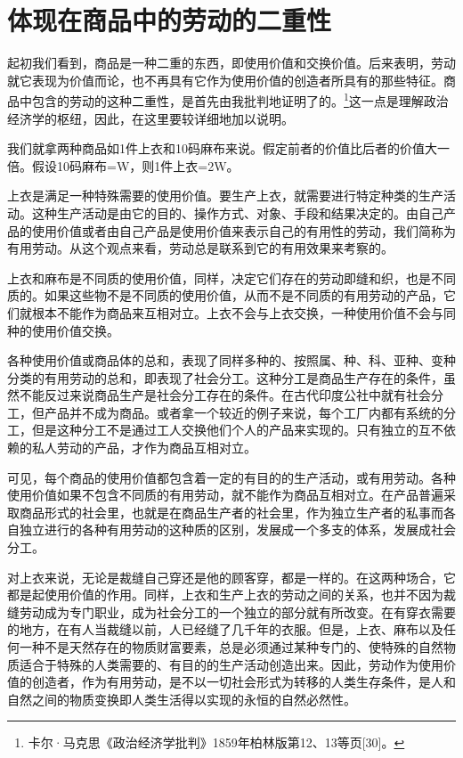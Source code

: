 \documentclass{ctexbook}
\begin{document}
    \section{体现在商品中的劳动的二重性}

    起初我们看到，商品是一种二重的东西，即使用价值和交换价值。后来表明，劳动就它表现为价值而论，也不再具有它作为使用价值的创造者所具有的那些特征。商品中包含的劳动的这种二重性，是首先由我批判地证明了的。\footnote{卡尔·马克思《政治经济学批判》1859年柏林版第12、13等页[30]。}这一点是理解政治经济学的枢纽，因此，在这里要较详细地加以说明。

    我们就拿两种商品如1件上衣和10码麻布来说。假定前者的价值比后者的价值大一倍。假设10码麻布=W，则1件上衣=2W。

    上衣是满足一种特殊需要的使用价值。要生产上衣，就需要进行特定种类的生产活动。这种生产活动是由它的目的、操作方式、对象、手段和结果决定的。由自己产品的使用价值或者由自己产品是使用价值来表示自己的有用性的劳动，我们简称为有用劳动。从这个观点来看，劳动总是联系到它的有用效果来考察的。

    上衣和麻布是不同质的使用价值，同样，决定它们存在的劳动即缝和织，也是不同质的。如果这些物不是不同质的使用价值，从而不是不同质的有用劳动的产品，它们就根本不能作为商品来互相对立。上衣不会与上衣交换，一种使用价值不会与同种的使用价值交换。

    各种使用价值或商品体的总和，表现了同样多种的、按照属、种、科、亚种、变种分类的有用劳动的总和，即表现了社会分工。这种分工是商品生产存在的条件，虽然不能反过来说商品生产是社会分工存在的条件。在古代印度公社中就有社会分工，但产品并不成为商品。或者拿一个较近的例子来说，每个工厂内都有系统的分工，但是这种分工不是通过工人交换他们个人的产品来实现的。只有独立的互不依赖的私人劳动的产品，才作为商品互相对立。

    可见，每个商品的使用价值都包含着一定的有目的的生产活动，或有用劳动。各种使用价值如果不包含不同质的有用劳动，就不能作为商品互相对立。在产品普遍采取商品形式的社会里，也就是在商品生产者的社会里，作为独立生产者的私事而各自独立进行的各种有用劳动的这种质的区别，发展成一个多支的体系，发展成社会分工。

    对上衣来说，无论是裁缝自己穿还是他的顾客穿，都是一样的。在这两种场合，它都是起使用价值的作用。同样，上衣和生产上衣的劳动之间的关系，也并不因为裁缝劳动成为专门职业，成为社会分工的一个独立的部分就有所改变。在有穿衣需要的地方，在有人当裁缝以前，人已经缝了几千年的衣服。但是，上衣、麻布以及任何一种不是天然存在的物质财富要素，总是必须通过某种专门的、使特殊的自然物质适合于特殊的人类需要的、有目的的生产活动创造出来。因此，劳动作为使用价值的创造者，作为有用劳动，是不以一切社会形式为转移的人类生存条件，是人和自然之间的物质变换即人类生活得以实现的永恒的自然必然性。
\end{document}
